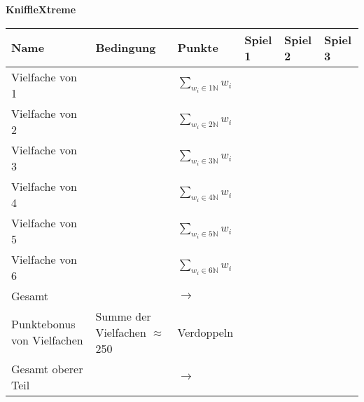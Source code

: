 \documentclass[a4paper,11pt]{exam}
\begin{document}
\begin{center}
    \Large\bf{KniffleXtreme}
\end{center}
\begin{tabular}{|l|l|l|l|l|l|}
    \hline
    Name                       & Bedingung                                                             & Punkte                                            & Spiel 1 & Spiel 2 & Spiel 3 \\
    \hline
    Vielfache von 1            &                                                                       & $\displaystyle\sum_{w_i \in 1\mathbb{N}} w_i$     &         &         &         \\
    \hline
    Vielfache von 2            &                                                                       & $\displaystyle\sum_{w_i \in 2\mathbb{N}} w_i$     &         &         &         \\
    \hline
    Vielfache von 3            &                                                                       & $\displaystyle\sum_{w_i \in 3\mathbb{N}} w_i$     &         &         &         \\
    \hline
    Vielfache von 4            &                                                                       & $\displaystyle\sum_{w_i \in 4\mathbb{N}} w_i$     &         &         &         \\
    \hline
    Vielfache von 5            &                                                                       & $\displaystyle\sum_{w_i \in 5\mathbb{N}} w_i$     &         &         &         \\
    \hline
    Vielfache von 6            &                                                                       & $\displaystyle\sum_{w_i \in 6\mathbb{N}} w_i$     &         &         &         \\
    \hline\hline
    Gesamt                     &                                                                       & $\longrightarrow $                                &         &         &         \\
    \hline
    Punktebonus von Vielfachen & Summe der Vielfachen $\approx$ 250                                    & Verdoppeln                                        &         &         &         \\ %
    \hline\hline
    Gesamt oberer Teil         &                                                                       & $\longrightarrow $                                &         &         &         \\

\end{tabular}
\end{document}
